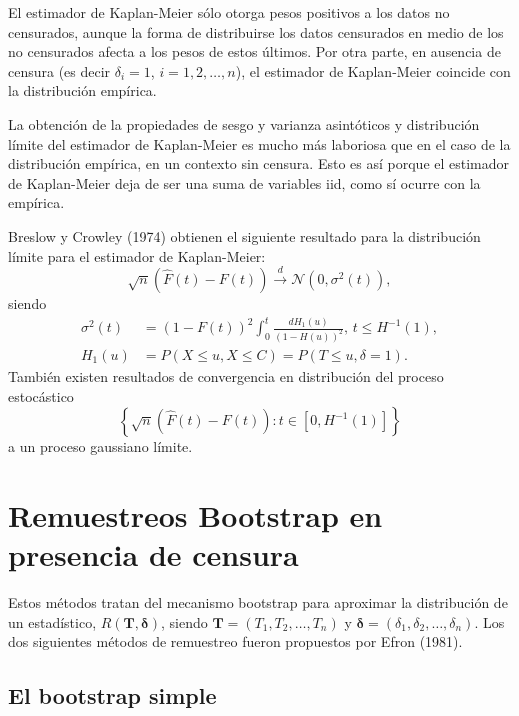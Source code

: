 \documentclass[]{book}
\theoremstyle{definition}
\theoremstyle{definition}
\theoremstyle{definition}
\theoremstyle{remark}
\begin{document}
El estimador de Kaplan-Meier sólo otorga pesos positivos a los datos no
censurados, aunque la forma de distribuirse los datos censurados en
medio de los no censurados afecta a los pesos de estos últimos. Por otra
parte, en ausencia de censura (es decir \(\delta _i=1\),
\(i=1,2,\ldots ,n\)), el estimador de Kaplan-Meier coincide con la
distribución empírica.

La obtención de la propiedades de sesgo y varianza asintóticos y
distribución límite del estimador de Kaplan-Meier es mucho más laboriosa
que en el caso de la distribución empírica, en un contexto sin censura.
Esto es así porque el estimador de Kaplan-Meier deja de ser una suma de
variables iid, como sí ocurre con la empírica.

Breslow y Crowley (1974) obtienen el siguiente resultado para la
distribución límite para el estimador de Kaplan-Meier:
\[\sqrt{n}\left( \hat{F}\left( t \right) -F\left( t \right) \right) 
\overset{d}{\longrightarrow} \mathcal{N}\left( 0,\sigma^2\left( t \right)
\right),\] siendo \[\begin{aligned}
\sigma^2\left( t \right) &= \left( 1-F\left( t \right) \right)
^2\int_{0}^{t}\frac{dH_1\left( u \right)}{\left( 1-H\left( u \right)
 \right)^2}\text{, }t\leq H^{-1}(1) , \\
H_1\left( u \right) &= P\left( X\leq u,X\leq C \right) =P\left( T\leq
u,\delta =1 \right).
\end{aligned}\] También existen resultados de convergencia en
distribución del proceso estocástico
\[\left\{ \sqrt{n}\left( \hat{F}\left( t \right) - F\left( t \right)
 \right) : t \in \left[ 0,H^{-1}(1) \right] \right\}\] a un proceso
gaussiano límite.

\section{Remuestreos Bootstrap en presencia de
censura}\label{remuestreos-bootstrap-en-presencia-de-censura}

Estos métodos tratan del mecanismo bootstrap para aproximar la
distribución de un estadístico,
\(R\left( \mathbf{T}, \boldsymbol{\delta} \right)\), siendo
\(\mathbf{T}=\left( T_1, T_2, \ldots,T_n \right)\) y
\(\boldsymbol{\delta}=\left( \delta _1,\delta_2, \ldots ,\delta _n \right)\).
Los dos siguientes métodos de remuestreo fueron propuestos por Efron
(1981).

\subsection{El bootstrap simple}\label{el-bootstrap-simple}
\end{document}
